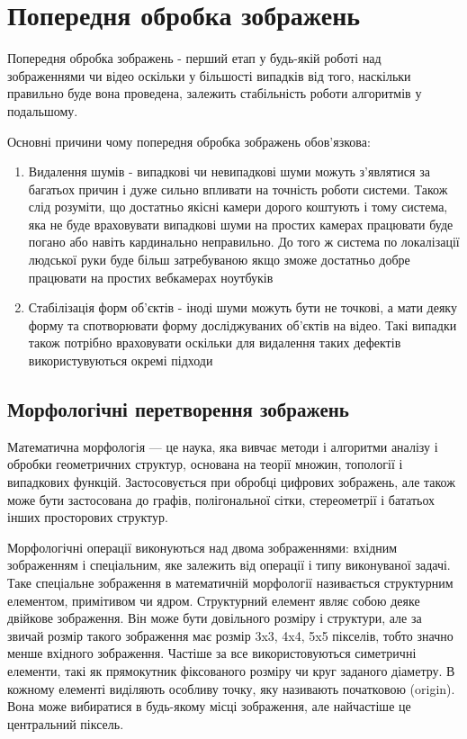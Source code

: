 \section{Попередня обробка зображень}

Попередня обробка зображень - перший етап у будь-якій роботі над зображеннями чи відео оскільки у більшості випадків від того, наскільки правильно буде вона проведена, залежить стабільність роботи алгоритмів у подальшому.

Основні причини чому попередня обробка зображень обов'язкова:
\begin{enumerate}
	\item Видалення шумів - випадкові чи невипадкові шуми можуть з'являтися за багатьох причин і дуже сильно впливати на точність роботи системи. Також слід розуміти, що достатньо якісні камери дорого коштують і тому система, яка не буде враховувати випадкові шуми на простих камерах працювати буде погано або навіть кардинально неправильно. До того ж система по локалізації людської руки буде більш затребуваною якщо зможе достатньо добре працювати на простих вебкамерах ноутбуків
	\item Стабілізація форм об'єктів - іноді шуми можуть бути не точкові, а мати деяку форму та спотворювати форму досліджуваних об'єктів на відео. Такі випадки також потрібно враховувати оскільки для видалення таких дефектів використувуються окремі підходи
\end{enumerate}
\subsection{Морфологічні перетворення зображень}
Математична морфологія — це наука, яка вивчає методи і алгоритми аналізу і обробки геометричних структур, основана на теорії множин, топології і випадкових функцій. Застосовується при обробці цифрових зображень, але також може бути застосована до графів, полігональної сітки, стереометрії і бататьох інших просторових структур.

Морфологічні операції виконуються над двома зображеннями: вхідним зображенням і спеціальним, яке залежить від операції і типу виконуваної задачі. Таке спеціальне зображення в математичній морфології називається структурним елементом, примітивом чи ядром. Структурний елемент являє собою деяке двійкове зображення. Він може бути довільного розміру і структури, але за звичай розмір такого зображення має розмір 3x3, 4x4, 5x5 пікселів, тобто значно менше вхідного зображення. Частіше за все використовуються симетричні елементи, такі як прямокутник фіксованого розміру чи круг заданого діаметру. В кожному елементі виділяють особливу точку, яку називають початковою (origin). Вона може вибиратися в будь-якому місці зображення, але найчастіше це центральний піксель.

